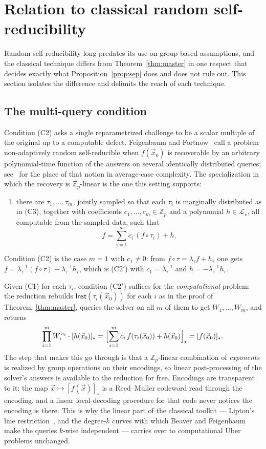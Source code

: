 \documentclass{conjura-solution}
\newcommand{\Zp}{\mathbb{Z}_p}
\newcommand{\vx}{\vec{x}}
\newcommand{\Inst}{\mathsf{Inst}}
\newcommand{\LL}{\mathcal{L}}
\begin{document}
\section{Relation to classical random self-reducibility}
\label{sec:classical}

Random self-reducibility long predates its use on group-based assumptions, and the classical
technique differs from Theorem~\ref{thm:master} in one respect that decides exactly what
Proposition~\ref{prop:sep} does and does not rule out. This section isolates the difference
and delimits the reach of each technique.

\subsection{The multi-query condition}

Condition (C2) asks a single reparametrized challenge to be a scalar multiple of the original
up to a computable defect. Feigenbaum and Fortnow~\cite{FF93} call a problem non-adaptively
random self-reducible when $f(\vx_0)$ is recoverable by an arbitrary polynomial-time function
of the answers on several identically distributed queries; see~\cite{BT06} for the place of
that notion in average-case complexity. The specialization in which the recovery is
$\Zp$-linear is the one this setting supports:
\begin{enumerate}[label=\textup{(C2$'$)},leftmargin=3.9em]
  \item there are $\tau_1,\dots,\tau_m$, jointly sampled so that each $\tau_i$ is marginally
        distributed as in (C3), together with coefficients $c_1,\dots,c_m\in\Zp$ and a
        polynomial $h\in\LL_\star$, all computable from the sampled data, such that
        \[
          f=\sum_{i=1}^{m}c_i\,(f\circ\tau_i)+h.
        \]
\end{enumerate}
Condition (C2) is the case $m=1$ with $c_1\neq 0$: from $f\circ\tau=\lambda_\tau f+h_\tau$ one
gets $f=\lambda_\tau^{-1}(f\circ\tau)-\lambda_\tau^{-1}h_\tau$, which is (C2$'$) with
$c_1=\lambda_\tau^{-1}$ and $h=-\lambda_\tau^{-1}h_\tau$.

Given (C1) for each $\tau_i$, condition (C2$'$) suffices for the \emph{computational} problem:
the reduction rebuilds $\Inst(\tau_i(\vx_0))$ for each $i$ as in the proof of
Theorem~\ref{thm:master}, queries the solver on all $m$ of them to get $W_1,\dots,W_m$, and
returns
\[
  \prod_{i=1}^{m}W_i^{\,c_i}\cdot[h(\vx_0)]_\star
  =\Bigl[\sum_{i=1}^{m}c_i\,f(\tau_i(\vx_0))+h(\vx_0)\Bigr]_\star=[f(\vx_0)]_\star.
\]
The step that makes this go through is that a $\Zp$-linear combination of \emph{exponents} is
realized by group operations on their encodings, so linear post-processing of the solver's
answers is available to the reduction for free. Encodings are transparent to it: the map
$\vx\mapsto[f(\vx)]_\star$ is a Reed--Muller codeword read through the encoding, and a linear
local-decoding procedure for that code never notices the encoding is there. This is why the
linear part of the classical toolkit --- Lipton's line restriction~\cite{Lipton91}, and the
degree-$k$ curves with which Beaver and Feigenbaum~\cite{BF90} make the queries $k$-wise
independent --- carries over to computational Uber problems unchanged.
\end{document}
